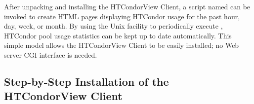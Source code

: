 After unpacking and installing the HTCondorView Client, a script named
 can be invoked to create HTML pages displaying HTCondor usage
for the past hour, day, week, or month.  
By using the Unix  facility to periodically execute
, HTCondor pool usage statistics can be kept up to date
automatically.  
This simple model allows the HTCondorView Client to be easily installed;
no Web server CGI interface is needed.

\subsection{\label{sec:condorview-client-step-by-step}
Step-by-Step Installation of the HTCondorView Client}

